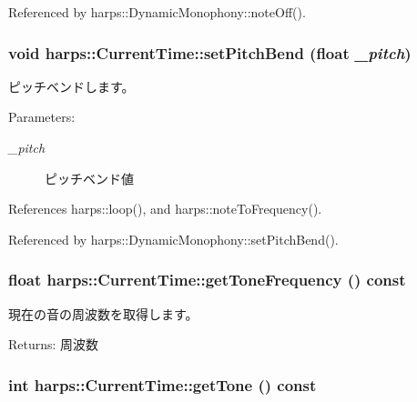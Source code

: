 Referenced by harps::DynamicMonophony::noteOff().
\subsubsection[setPitchBend]{\setlength{\rightskip}{0pt plus 5cm}void harps::CurrentTime::setPitchBend (float {\em \_\-pitch})\hspace{0.3cm}{\tt  [inline]}}\label{classharps_1_1CurrentTime_1cf8a7b0fb4fde33e472acf9d086816d}


ピッチベンドします。 \begin{Desc}
\item[Parameters:]
\begin{description}
\item[{\em \_\-pitch}]ピッチベンド値 \end{description}
\end{Desc}


References harps::loop(), and harps::noteToFrequency().

Referenced by harps::DynamicMonophony::setPitchBend().
\subsubsection[getToneFrequency]{\setlength{\rightskip}{0pt plus 5cm}float harps::CurrentTime::getToneFrequency () const\hspace{0.3cm}{\tt  [inline]}}\label{classharps_1_1CurrentTime_3fbbd98cbd3c4517bbf49e62d86f2cc5}


現在の音の周波数を取得します。 \begin{Desc}
\item[Returns:]周波数 \end{Desc}
\subsubsection[getTone]{\setlength{\rightskip}{0pt plus 5cm}int harps::CurrentTime::getTone () const\hspace{0.3cm}{\tt  [inline]}}\label{classharps_1_1CurrentTime_3f08fd579a5b04db6ceb2497984d237b}


